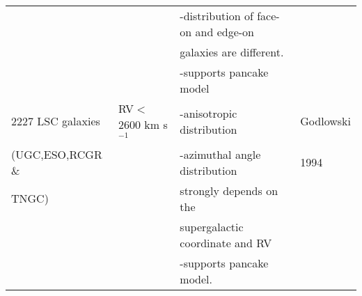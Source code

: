 \begin{center}
\begin{tabular}[lp=7cm]{|l|l|l|l|}
					&								&-distribution of face-on and edge-on	&\\
					&								&galaxies are different.					&\\
					&								&-supports pancake model					&\\
\hline
2227 LSC galaxies	&RV$<$2600 km s$^{-1}$			&-anisotropic distribution				&Godlowski\\
(UGC,ESO,RCGR \&		&								&-azimuthal angle distribution 	&1994\\
TNGC)				&								& strongly depends on the 	&\\
					&								&supergalactic coordinate and RV									&\\
					&								&-supports pancake model.					&\\
					\hline

					
					

\end{tabular}
\end{center}
